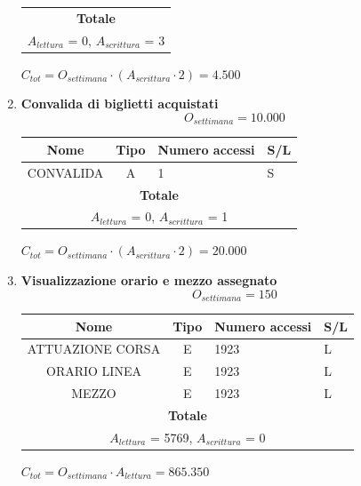 \documentclass[12pt,a4paper]{report}
\begin{document}
\begin{enumerate}[label=\textbf{\arabic*)}]
\begin{table}[H]
\begin{tabular}{|c|c|l|l|}
    \hline
    \multicolumn{4}{c}{\textbf{Totale}} \\    
    \multicolumn{4}{c}{${A_{lettura}}$ = 0, ${A_{scrittura}}$ = 3} \\
    \hline
    \end{tabular}
    \end{table}
    \begin{center}
    ${C_{tot} = {O_{settimana}}\cdot({A_{scrittura}}\cdot 2) = 4.500}$
    \end{center}

    \item \textbf{Convalida di biglietti acquistati} \\
    \[ {O_{settimana} = 10.000} \]
    \begin{table}[H]
    \centering
    \begin{tabular}{|c|c|l|l|}
    \hline
    \textbf{Nome} & \textbf{Tipo} & \textbf{Numero accessi} & \textbf{S/L} \\
    \hline
    CONVALIDA & A & 1 & S \\
    \hline
    \multicolumn{4}{c}{\textbf{Totale}} \\    
    \multicolumn{4}{c}{${A_{lettura}}$ = 0, ${A_{scrittura}}$ = 1} \\
    \hline
    \end{tabular}
    \end{table}
    \begin{center}
    ${C_{tot} = {O_{settimana}}\cdot({A_{scrittura}}\cdot 2) = 20.000}$
    \end{center}

    \item \textbf{Visualizzazione orario e mezzo assegnato} \\
    \[ {O_{settimana} = 150} \]
    \begin{table}[H]
    \centering
    \begin{tabular}{|c|c|l|l|}
    \hline
    \textbf{Nome} & \textbf{Tipo} & \textbf{Numero accessi} & \textbf{S/L} \\
    \hline
    ATTUAZIONE CORSA & E & 1923 & L \\ 
    \hline
    ORARIO LINEA & E & 1923 & L \\ 
    \hline
    MEZZO & E & 1923 & L \\
    \hline
    \multicolumn{4}{c}{\textbf{Totale}} \\    
    \multicolumn{4}{c}{${A_{lettura}}$ = 5769, ${A_{scrittura}}$ = 0} \\
    \hline
    \end{tabular}
    \end{table}
    \begin{center}
    ${C_{tot} = {O_{settimana}}\cdot {A_{lettura}} = 865.350}$
    \end{center}


\end{enumerate}
\end{document}
